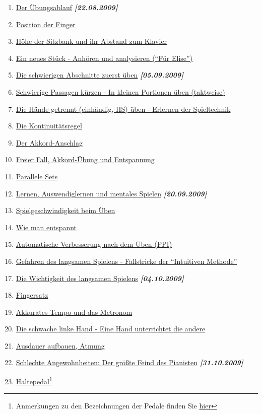 \begin{enumerate} 
 \item \hyperref[c1ii1]{Der Übungsablauf} \textbf{\textit{[22.08.2009]}}
 \item \hyperref[c1ii2]{Position der Finger}
 \item \hyperref[c1ii3]{Höhe der Sitzbank und ihr Abstand zum Klavier}
 \item \hyperref[c1ii4]{Ein neues Stück - Anhören und analysieren (\enquote{Für Elise})}
 \item \hyperref[c1ii5]{Die schwierigen Abschnitte zuerst üben}  \textbf{\textit{[05.09.2009]}}
 \item \hyperref[c1ii6]{Schwierige Passagen kürzen - In kleinen Portionen üben (taktweise)}
 \item \hyperref[c1ii7]{Die Hände getrennt (einhändig, HS) üben - Erlernen der Spieltechnik}
 \item \hyperref[c1ii8]{Die Kontinuitätsregel}
 \item \hyperref[c1ii9]{Der Akkord-Anschlag}
 \item \hyperref[c1ii10]{Freier Fall, Akkord-Übung und Entspannung}
 \item \hyperref[c1ii11]{Parallele Sets}
 \item \hyperref[c1ii12]{Lernen, Auswendiglernen und mentales Spielen} \textbf{\textit{[20.09.2009]}}
 \item \hyperref[c1ii13]{Spielgeschwindigkeit beim Üben}
 \item \hyperref[c1ii14]{Wie man entspannt}
 \item \hyperref[c1ii15]{Automatische Verbesserung nach dem Üben (PPI)}
 \item \hyperref[c1ii16]{Gefahren des langsamen Spielens - Fallstricke der \enquote{Intuitiven Methode}}
 \item \hyperref[c1ii17]{Die Wichtigkeit des langsamen Spielens} \textbf{\textit{[04.10.2009]}}

 \item \hyperref[c1ii18]{Fingersatz}
 \item \hyperref[c1ii19]{Akkurates Tempo und das Metronom}
 \item \hyperref[c1ii20]{Die schwache linke Hand - Eine Hand unterrichtet die andere}
 \item \hyperref[c1ii21]{Ausdauer aufbauen, Atmung}

 \item \hyperref[c1ii22]{Schlechte Angewohnheiten: Der größte Feind des Pianisten} \textbf{\textit{[31.10.2009]}}
 \item \hyperref[c1ii23]{Haltepedal}\footnote{Anmerkungen zu den Bezeichnungen der Pedale finden Sie \hyperref[Pedale]{hier}}
 

\end{enumerate}
